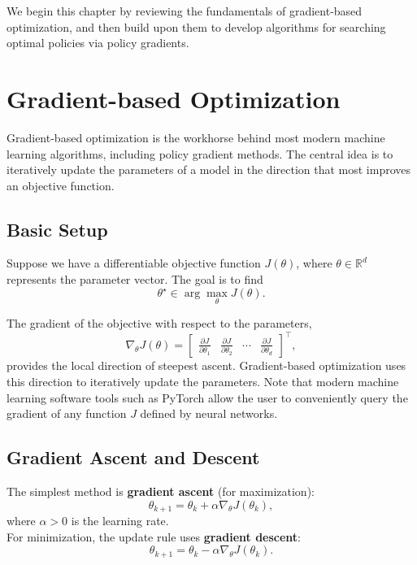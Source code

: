 \documentclass[
]{book}
\theoremstyle{definition}
\theoremstyle{definition}
\theoremstyle{definition}
\theoremstyle{definition}
\theoremstyle{remark}
\begin{document}
We begin this chapter by reviewing the fundamentals of gradient-based optimization, and then build upon them to develop algorithms for searching optimal policies via policy gradients.

\section{Gradient-based Optimization}\label{gradient-optimization}

Gradient-based optimization is the workhorse behind most modern machine learning algorithms, including policy gradient methods. The central idea is to iteratively update the parameters of a model in the direction that most improves an objective function.

\subsection{Basic Setup}\label{basic-setup}

Suppose we have a differentiable objective function \(J(\theta)\), where \(\theta \in \mathbb{R}^d\) represents the parameter vector. The goal is to find
\[
\theta^\star \in \arg\max_\theta J(\theta).
\]

The gradient of the objective with respect to the parameters,
\[
\nabla_\theta J(\theta) = 
\begin{bmatrix}
\frac{\partial J}{\partial \theta_1} &
\frac{\partial J}{\partial \theta_2} &
\cdots &
\frac{\partial J}{\partial \theta_d}
\end{bmatrix}^\top,
\]
provides the local direction of steepest ascent. Gradient-based optimization uses this direction to iteratively update the parameters. Note that modern machine learning software tools such as PyTorch allow the user to conveniently query the gradient of any function \(J\) defined by neural networks.

\subsection{Gradient Ascent and Descent}\label{gradient-ascent-and-descent}

The simplest method is \textbf{gradient ascent} (for maximization):
\[
\theta_{k+1} = \theta_k + \alpha \nabla_\theta J(\theta_k),
\]
where \(\alpha > 0\) is the learning rate.\\
For minimization, the update rule uses \textbf{gradient descent}:
\[
\theta_{k+1} = \theta_k - \alpha \nabla_\theta J(\theta_k).
\]
\end{document}
